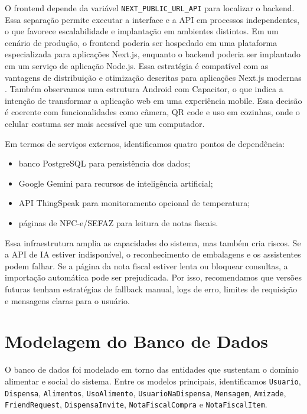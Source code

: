 \documentclass[12pt]{article}
\begin{document}
O frontend depende da variável \texttt{NEXT\_PUBLIC\_URL\_API} para localizar o backend. Essa separação permite executar a interface e a API em processos independentes, o que favorece escalabilidade e implantação em ambientes distintos. Em um cenário de produção, o frontend poderia ser hospedado em uma plataforma especializada para aplicações Next.js, enquanto o backend poderia ser implantado em um serviço de aplicação Node.js. Essa estratégia é compatível com as vantagens de distribuição e otimização descritas para aplicações Next.js modernas \cite{prabakar2025}. Também observamos uma estrutura Android com Capacitor, o que indica a intenção de transformar a aplicação web em uma experiência mobile. Essa decisão é coerente com funcionalidades como câmera, QR code e uso em cozinhas, onde o celular costuma ser mais acessível que um computador.

Em termos de serviços externos, identificamos quatro pontos de dependência:

\begin{itemize}
    \item banco PostgreSQL para persistência dos dados;
    \item Google Gemini para recursos de inteligência artificial;
    \item API ThingSpeak para monitoramento opcional de temperatura;
    \item páginas de NFC-e/SEFAZ para leitura de notas fiscais.
\end{itemize}

Essa infraestrutura amplia as capacidades do sistema, mas também cria riscos. Se a API de IA estiver indisponível, o reconhecimento de embalagens e os assistentes podem falhar. Se a página da nota fiscal estiver lenta ou bloquear consultas, a importação automática pode ser prejudicada. Por isso, recomendamos que versões futuras tenham estratégias de fallback manual, logs de erro, limites de requisição e mensagens claras para o usuário.

\section{Modelagem do Banco de Dados}

O banco de dados foi modelado em torno das entidades que sustentam o domínio alimentar e social do sistema. Entre os modelos principais, identificamos \texttt{Usuario}, \texttt{Dispensa}, \texttt{Alimentos}, \texttt{UsoAlimento}, \texttt{UsuarioNaDispensa}, \texttt{Mensagem}, \texttt{Amizade}, \texttt{FriendRequest}, \texttt{DispensaInvite}, \texttt{NotaFiscalCompra} e \texttt{NotaFiscalItem}.
\end{document}
